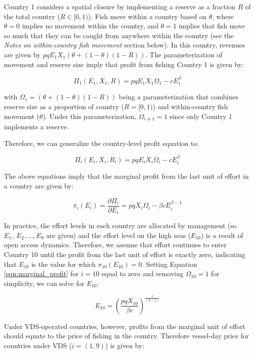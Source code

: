 \documentclass[12pt]{article}
\begin{document}
Country 1 considers a spatial closure by implementing a reserve as a fraction $R$ of the total country ($R \in[0,1)$). Fish move within a country based on $\theta$, where $\theta = 0$ implies no movement within the country, and $\theta = 1$ implies that fish move so much that they can be caught from anywhere within the country (see the \emph{Notes on within-country fish movement} section below). In this country, revenues are given by $pqE_1X_1(\theta + (1 - \theta)(1 - R))$. The parameterization of movement and reserve size imply that profit from fishing Country 1 is given by:

$$
\Pi_1(E_1,X_1,R) = pqE_1X_1\Omega_1-cE_1^\beta
$$

\noindent with $\Omega_1 = (\theta + (1 - \theta)(1 - R))$ being a parameterization that combines reserve size as a proportion of country ($R =  [0, 1)$) and within-country fish movement ($\theta$). Under this parameterization, $\Omega_{i \neq 1} = 1$ since only Country 1 implements a reserve.

Therefore, we can generalize the country-level profit equation to:

$$
\Pi_i(E_i,X_i, R_i) = pqE_iX_i\Omega_i-cE_i^\beta
$$

\noindent The above equations imply that the marginal profit from the last unit of effort in a country are given by:

\begin{equation}
\pi_i(E_i) = \frac{\partial \Pi_i}{\partial E_i} = pqX_i\Omega_i - \beta cE_i^{\beta-1}
\label{eqn:marginal_profit}
\end{equation}

In practice, the effort levels in each country are allocated by management (so $E_{1},\ E_{2},...,E_{9}$ are given) and the effort level on the high seas ($E_{10}$) is a result of open access dynamics. Therefore, we assume that effort continues to enter Country 10 until the profit from the last unit of effort is exactly zero, indicating that $E_{10}$ is the value for which $\pi_{10}(E_{10})  = 0$. Setting Equation \ref{eqn:marginal_profit} for $i = 10$ equal to zero and removing $\Omega_{10} = 1$ for simplicity, we can solve for $E_{10}$:

\begin{equation}
E_{10} = \left(\frac{pqX_{10}}{\beta c}\right)^{\frac{1}{(\beta - 1)}}
\label{eqn:effort_hs}
\end{equation}

Under VDS-operated countries, however, profits from the marginal unit of effort should equate to the price of fishing in the country. Therefore vessel-day price for countries under VDS ($i = (1, 9)$) is  given by:
\end{document}
